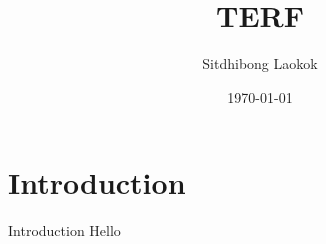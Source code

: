 \documentclass{beamer}
\title{TERF}
\date{\today}
\author{Sitdhibong Laokok}
\institute{Faculty of Engineering, Chulalongkorn University}
\begin{document}
\maketitle

\section{Introduction}
\begin{frame}{Introduction}
  Hello
\end{frame}
\end{document}
